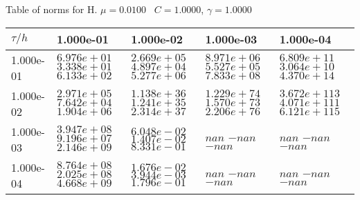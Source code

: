 \begin{center}
Table of norms for H. $\mu = 0.0100$ \, $C = 1.0000$, $\gamma = 1.0000$
  
\begin{tabular}{|p{1in}|p{1in}|p{1in}|p{1in}|p{1in}|} \hline
$\tau / h$ &1.000e-01 &1.000e-02 &1.000e-03 &1.000e-04 \\ \hline 
1.000e-01 & $6.976e+01$  $3.338e+01$  $6.133e+02$  & $2.669e+05$  $4.897e+04$  $5.277e+06$  & $8.971e+06$  $5.527e+05$  $7.833e+08$  & $6.809e+11$  $3.064e+10$  $4.370e+14$  \\ \hline 
1.000e-02 & $2.971e+05$  $7.642e+04$  $1.904e+06$  & $1.138e+36$  $1.241e+35$  $2.314e+37$  & $1.229e+74$  $1.570e+73$  $2.206e+76$  & $3.672e+113$  $4.071e+111$  $6.121e+115$  \\ \hline 
1.000e-03 & $3.947e+08$  $9.196e+07$  $2.146e+09$  & $6.048e-02$  $1.407e-02$  $8.331e-01$  & $nan$  $-nan$  $-nan$  & $nan$  $-nan$  $-nan$  \\ \hline 
1.000e-04 & $8.764e+08$  $2.025e+08$  $4.668e+09$  & $1.676e-02$  $3.944e-03$  $1.796e-01$  & $nan$  $-nan$  $-nan$  & $nan$  $-nan$  $-nan$  \\ \hline 

\end{tabular}\\[20pt]
\end{center}
